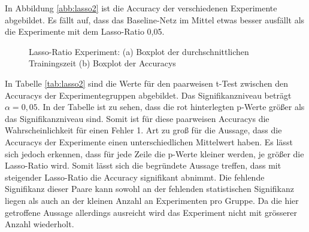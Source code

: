 In Abbildung \ref{abb:lasso2} ist die Accuracy der verschiedenen Experimente abgebildet. Es fällt auf, dass das Baseline-Netz im Mittel etwas besser ausfällt als die Experimente mit dem Lasso-Ratio 0,05.
\begin{figure}
     \centering
     \hfill
     \caption{Lasso-Ratio Experiment: (a) Boxplot der durchschnittlichen Trainingszeit (b) Boxplot der Accuracys}
     \label{abb:lasso}
\end{figure}
In Tabelle \ref{tab:lasso2} sind die Werte für den paarweisen t-Test zwischen den Accuracys der Experimentegruppen abgebildet. Das Signifikanzniveau beträgt $\alpha =0,05$. In der Tabelle ist zu sehen, dass die rot hinterlegten p-Werte größer als das Signifikanzniveau sind. Somit ist für diese paarweisen Accuracys die Wahrscheinlichkeit für einen Fehler 1. Art zu groß für die Aussage, dass die Accuracys der Experimente einen unterschiedlichen Mittelwert haben. Es lässt sich jedoch erkennen, dass für jede Zeile die p-Werte kleiner werden, je größer die Lasso-Ratio wird. Somit lässt sich die begründete Aussage treffen, dass mit steigender Lasso-Ratio die Accuracy signifikant abnimmt.
Die fehlende Signifikanz dieser Paare kann sowohl an der fehlenden statistischen Signifikanz liegen als auch an der kleinen Anzahl an Experimenten pro Gruppe. Da die hier getroffene Aussage allerdings ausreicht wird das Experiment nicht mit grösserer Anzahl wiederholt.




